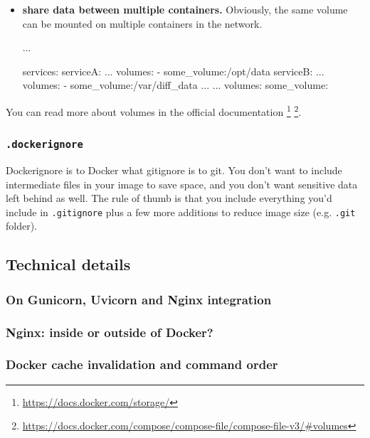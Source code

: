 \documentclass{article}
\newcommand{\flink}[1]{\footnote{\href{#1}{#1}}}
\begin{document}
\begin{itemize}
{        }
    \item{\textbf{share data between multiple containers.} Obviously, the same volume can be mounted on multiple containers in the network.

        \begin{dockercode}
            ...

            services:
                serviceA:
                    ...
                    volumes:
                        - some_volume:/opt/data
                serviceB:
                    ...
                    volumes:
                        - some_volume:/var/diff_data
                ...
            ...
            volumes:
                some_volume:
        \end{dockercode}
        }
\end{itemize}

You can read more about volumes in the official documentation \flink{https://docs.docker.com/storage/} \flink{https://docs.docker.com/compose/compose-file/compose-file-v3/\#volumes}.

\subsubsection{\texttt{.dockerignore}}

Dockerignore is to Docker what gitignore is to git. You don't want to include intermediate files in your image to save space, and you don't want sensitive data left behind as well. The rule of thumb is that you include everything you'd include in \texttt{.gitignore} plus a few more additions to reduce image size (e.g. \texttt{.git} folder).

\subsection{Technical details}

\subsubsection{On Gunicorn, Uvicorn and Nginx integration}

\subsubsection{Nginx: inside or outside of Docker?}

\subsubsection{Docker cache invalidation and command order}
\end{document}

